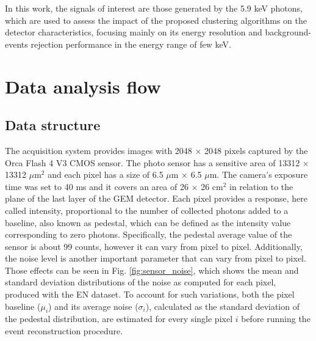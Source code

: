 \documentclass[a4paper,11pt]{article}
\begin{document}
In this work, the signals of interest are those generated by the 5.9 keV photons, which are used to assess the impact of the proposed clustering algorithms on the detector characteristics, focusing mainly on its energy resolution and background-events rejection performance in the energy range of few keV.

\section{Data analysis flow}
\label{sec:daq}

\subsection{Data structure}

The acquisition system provides images with 2048 $\times$ 2048 pixels captured by the Orca Flash 4 V3 CMOS sensor. The photo sensor has a sensitive area of 13312 $\times$ 13312 $\mu$m$^2$ and each pixel has a size of 6.5 $\mu$m $\times$ 6.5 $\mu$m.
The camera's exposure time was set to 40 ms and it covers an area of 26 $\times$ 26 cm$^2$ in relation to the plane of the last layer of the GEM detector. Each pixel provides a response, here called intensity, proportional to the number of collected photons \cite{bib:nim_orange1} added to a baseline, also known as pedestal, which can be defined as the intensity value corresponding to zero photons. Specifically, the pedestal average value of the sensor is about 99 counts, however it can vary from pixel to pixel.
Additionally, the noise level is another important parameter that can vary from pixel to pixel.
Those effects can be seen in Fig. \ref{fig:sensor_noise}, which shows the mean and standard deviation distributions of the noise as computed for each pixel, produced with the EN dataset.
To account for such variations, both the pixel baseline ($\mu_i$) and its average noise ($\sigma_i$), calculated as the standard deviation of the pedestal distribution,  are estimated for every single pixel $i$ before running the event reconstruction procedure.
\end{document}
